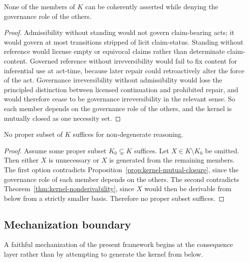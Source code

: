 \begin{proposition}
\label{prop:kernel-mutual-closure}
None of the members of $K$ can be coherently asserted while denying the governance role of the others.
\end{proposition}

\begin{proof}
Admissibility without standing would not govern claim-bearing acts; it would govern at most transitions stripped of licit claim-status. Standing without reference would license empty or equivocal claims rather than determinate claim-content. Governed reference without irreversibility would fail to fix content for inferential use at act-time, because later repair could retroactively alter the force of the act. Governance irreversibility without admissibility would lose the principled distinction between licensed continuation and prohibited repair, and would therefore cease to be governance irreversibility in the relevant sense. So each member depends on the governance role of the others, and the kernel is mutually closed as one necessity set.\cite{MaleyFoundationalClosure}
\end{proof}

\begin{corollary}[Minimality]
\label{cor:kernel-minimality}
No proper subset of $K$ suffices for non-degenerate reasoning.
\end{corollary}

\begin{proof}
Assume some proper subset $K_0 \subsetneq K$ suffices. Let $X \in K \setminus K_0$ be omitted. Then either $X$ is unnecessary or $X$ is generated from the remaining members. The first option contradicts Proposition~\ref{prop:kernel-mutual-closure}, since the governance role of each member depends on the others. The second contradicts Theorem~\ref{thm:kernel-nonderivability}, since $X$ would then be derivable from below from a strictly smaller basis. Therefore no proper subset suffices.
\end{proof}

\subsection{Mechanization boundary}

\begin{theorem}
\label{thm:mechanization-boundary}
A faithful mechanization of the present framework begins at the consequence layer rather than by attempting to generate the kernel from below.
\end{theorem}

